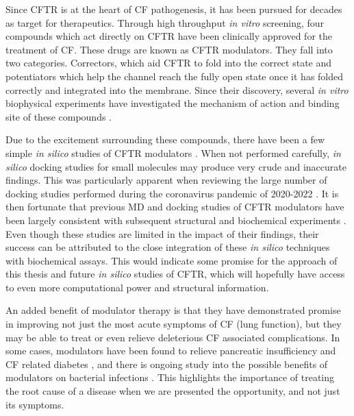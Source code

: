 Since CFTR is at the heart of CF pathogenesis, it has been pursued for decades as target for therapeutics. Through high throughput \textit{in vitro} screening, four compounds which act directly on CFTR have been clinically approved for the treatment of CF. These drugs are known as CFTR modulators. They fall into two categories. Correctors, which aid CFTR to fold into the correct state and potentiators which help the channel reach the fully open state once it has folded correctly and integrated into the membrane. Since their discovery, several \textit {in vitro} biophysical experiments have investigated the mechanism of action and binding site of these compounds \cite{csanady2019,  laselva2022, yeh2017, yeh2019, fiedorczuk2022, krainer2018}. 

Due to the excitement surrounding these compounds, there have been a few simple \textit{in silico} studies of CFTR modulators \cite{molinski2018, bitam2021, baatallah2021, froux2020}. When not performed carefully, \textit{in silico} docking studies for small molecules may produce very crude and inaccurate findings. This was particularly apparent when reviewing the large number of docking studies performed during the coronavirus pandemic of 2020-2022 \cite{gimeno2019, derek_lowe_virtual_screening_2022, ceron-carrasco2022}. It is then fortunate that previous MD and docking studies of CFTR modulators have been largely consistent with subsequent structural and biochemical experiments \cite{liu2019, scientifique2019, yeh2019, yeh2017, fiedorczuk2022}. Even though these studies are limited in the impact of their findings, their success can be attributed to the close integration of these \textit{in silico} techniques with biochemical assays. This would indicate some promise for the approach of this thesis and future \textit{in silico} studies of CFTR, which will hopefully have access to even more computational power and structural information. 


An added benefit of modulator therapy is that they have demonstrated promise in improving not just the most acute symptoms of CF (lung function), but they may be able to treat or even relieve deleterious CF associated complications. In some cases, modulators have been found to relieve pancreatic insufficiency and CF related diabetes \cite{gaines2021,lopes-pacheco2020, yi2021}, and there is ongoing study into the possible benefits of modulators on bacterial infections \cite{harvey2022}. This highlights the importance of treating the root cause of a disease when we are presented the opportunity, and not just its symptoms. 

